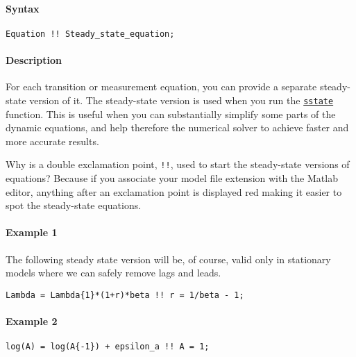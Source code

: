 


	\paragraph{Syntax}\label{syntax}

\begin{verbatim}
Equation !! Steady_state_equation;
\end{verbatim}

\paragraph{Description}\label{description}

For each transition or measurement equation, you can provide a separate
steady-state version of it. The steady-state version is used when you
run the \href{model/sstate}{\texttt{sstate}} function. This is useful
when you can substantially simplify some parts of the dynamic equations,
and help therefore the numerical solver to achieve faster and more
accurate results.

Why is a double exclamation point, \texttt{!!}, used to start the
steady-state versions of equations? Because if you associate your model
file extension with the Matlab editor, anything after an exclamation
point is displayed red making it easier to spot the steady-state
equations.

\paragraph{Example 1}\label{example-1}

The following steady state version will be, of course, valid only in
stationary models where we can safely remove lags and leads.

\begin{verbatim}
Lambda = Lambda{1}*(1+r)*beta !! r = 1/beta - 1;
\end{verbatim}

\paragraph{Example 2}\label{example-2}

\begin{verbatim}
log(A) = log(A{-1}) + epsilon_a !! A = 1;
\end{verbatim}


